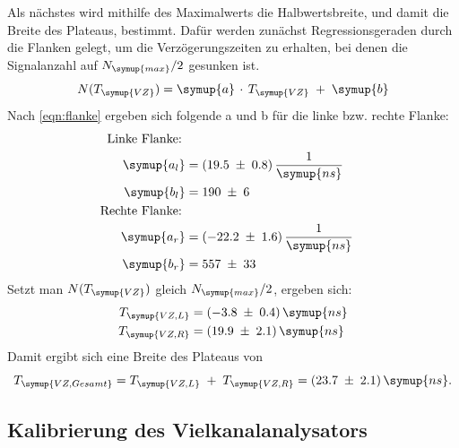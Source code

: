 \noindent
Als nächstes wird mithilfe des
Maximalwerts die Halbwertsbreite, und damit die Breite des Plateaus, bestimmt.
Dafür werden zunächst Regressionsgeraden durch die Flanken gelegt, um die Verzögerungszeiten
zu erhalten, bei denen die Signalanzahl auf $N_{\symup{max}}/2$ gesunken ist.
\begin{equation}
  N(T_{\symup{VZ}}) = \symup{a}\,\cdot\,T_{\symup{VZ}}\;+\;\symup{b}
  \label{eqn:flanke}
\end{equation}
Nach \ref{eqn:flanke} ergeben sich folgende a und b für die linke bzw. rechte Flanke:
\begin{align*}
  \text{Linke Flanke:\;}\\
  \symup{a_l} &= (19.5\;\pm\;0.8)\,\frac{1}{\symup{ns}}\\
  \symup{b_l} &= 190\;\pm\;6\\
  \text{Rechte Flanke:\;}\\
  \symup{a_r} &= (-22.2\;\pm\;1.6)\,\frac{1}{\symup{ns}}\\
  \symup{b_r} &= 557\;\pm\;33\\
\end{align*}
Setzt man $N(T_{\symup{VZ}})$ gleich $N_{\symup{max}}/2$, ergeben sich:
\begin{align*}
  T_{\symup{VZ,L}} &= (-3.8\;\pm\;0.4)\,\symup{ns}\\
  T_{\symup{VZ,R}} &= (19.9\;\pm\;2.1)\,\symup{ns}\\
\end{align*}
Damit ergibt sich eine Breite des Plateaus von
\begin{equation*}
  T_{\symup{VZ,Gesamt}} = T_{\symup{VZ,L}}\;+\;T_{\symup{VZ,R}} = (23.7\;\pm\;2.1)\,\symup{ns}.
\end{equation*}

\subsection{Kalibrierung des Vielkanalanalysators}
\label{sec:vielkanalanalysator}

